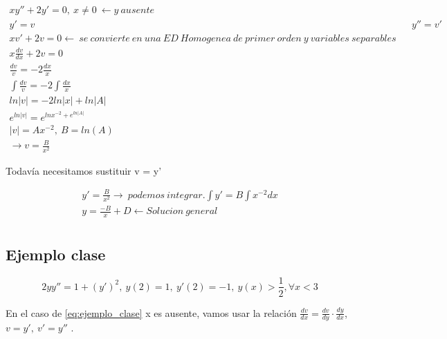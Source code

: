 \documentclass{article}
\begin{document}
\begin{eqnarray}
\nonumber xy'' + 2y' = 0 , \ x \neq 0 \ \leftarrow y \ ausente\\
\nonumber y' = v &	& y'' = v' \\
\nonumber xv' +2v = 0 \leftarrow \  se \ convierte \ en \ una \ ED \ Homogenea \ de \ primer \ orden \ y \ variables \ separables \\
\nonumber x \frac{dv}{dx} + 2v = 0 \\
\nonumber \frac{dv}{v} = -2 \frac{dx}{x} \\
\nonumber \int \frac{dv}{v} = -2 \int \frac{dx}{x} \\
\nonumber ln |v| = -2 ln|x| + ln |A| \\ 
\nonumber e^{ln |v|} = e^{ln x^{-2} + e^{ln |A|}} \\
\nonumber |v| = Ax^{-2} , \ B = ln (A) \\
\nonumber \rightarrow v = \frac{B}{x^2}
\end{eqnarray}

Todavía necesitamos sustituir v = y'


\begin{eqnarray}
\nonumber y' = \frac{B}{x^2} \rightarrow \ podemos \ integrar.
\nonumber \int y'= B \int x^{-2} dx \\
\nonumber y = \frac{-B}{x} + D \leftarrow Solucion \ general \\ 
\end{eqnarray}

\subsection{Ejemplo clase}

\begin{equation}
2yy''= 1+ \left( y' \right)^2 ,  \ y(2) = 1, \  y' (2) = -1, \ y(x) > \frac{1}{2}, \forall x<3  \label{eq:ejemplo_clase}
\end{equation}

En el caso de \eqref{eq:ejemplo_clase} x es ausente, vamos usar la relación  $\frac{dv}{dx} = \frac{dv}{dy} \cdot \frac{dy}{dx}$, $v = y', \ v' = y''$ .
\end{document}
